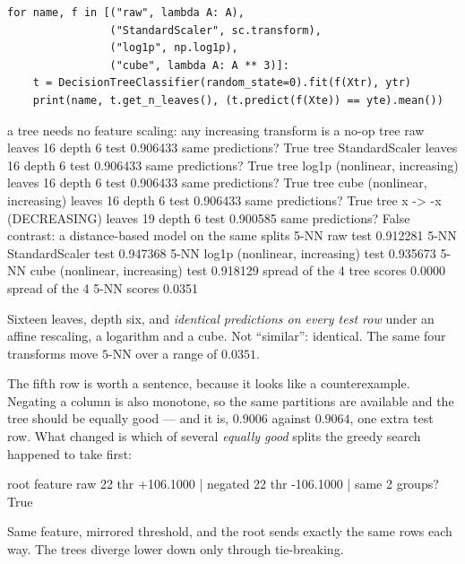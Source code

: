 \documentclass[11pt]{article}
\begin{document}
\begin{lstlisting}
for name, f in [("raw", lambda A: A),
                ("StandardScaler", sc.transform),
                ("log1p", np.log1p),
                ("cube", lambda A: A ** 3)]:
    t = DecisionTreeClassifier(random_state=0).fit(f(Xtr), ytr)
    print(name, t.get_n_leaves(), (t.predict(f(Xte)) == yte).mean())
\end{lstlisting}
\begin{codeout}
a tree needs no feature scaling: any increasing transform is a no-op
   tree  raw                              leaves 16 depth 6  test 0.906433  same predictions? True
   tree  StandardScaler                   leaves 16 depth 6  test 0.906433  same predictions? True
   tree  log1p (nonlinear, increasing)    leaves 16 depth 6  test 0.906433  same predictions? True
   tree  cube  (nonlinear, increasing)    leaves 16 depth 6  test 0.906433  same predictions? True
   tree  x -> -x (DECREASING)             leaves 19 depth 6  test 0.900585  same predictions? False
   contrast: a distance-based model on the same splits
   5-NN  raw                                                  test 0.912281
   5-NN  StandardScaler                                       test 0.947368
   5-NN  log1p (nonlinear, increasing)                        test 0.935673
   5-NN  cube  (nonlinear, increasing)                        test 0.918129
   spread of the 4 tree scores 0.0000    spread of the 4 5-NN scores 0.0351
\end{codeout}

Sixteen leaves, depth six, and \emph{identical predictions on every test row}
under an affine rescaling, a logarithm and a cube. Not ``similar'': identical.
The same four transforms move $5$-NN over a range of $0.0351$.

The fifth row is worth a sentence, because it looks like a counterexample.
Negating a column is also monotone, so the same partitions are available and
the tree should be equally good --- and it is, $0.9006$ against $0.9064$, one
extra test row. What changed is which of several \emph{equally good} splits
the greedy search happened to take first:

\begin{codeout}
   root feature raw 22 thr +106.1000 | negated 22 thr -106.1000 | same 2 groups? True
\end{codeout}

Same feature, mirrored threshold, and the root sends exactly the same rows
each way. The trees diverge lower down only through tie-breaking.
\end{document}
